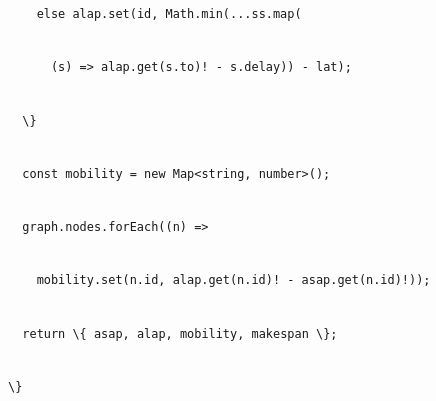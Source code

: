 \documentclass[
]{article}
\newcommand{\passthrough}[1]{#1}
\begin{document}
\passthrough{\lstinline!    !}\passthrough{\lstinline!else!}\passthrough{\lstinline! !}\passthrough{\lstinline!alap.set!}\passthrough{\lstinline!(id,!}\passthrough{\lstinline! !}\passthrough{\lstinline!Math.min!}\passthrough{\lstinline!(...!}\passthrough{\lstinline!ss.map!}\passthrough{\lstinline!(!}\strut \\
\passthrough{\lstinline!      !}\passthrough{\lstinline!(s)!}\passthrough{\lstinline! !}\passthrough{\lstinline!=>!}\passthrough{\lstinline! !}\passthrough{\lstinline!alap.get!}\passthrough{\lstinline"(s.to)!"}\passthrough{\lstinline! !}\passthrough{\lstinline!-!}\passthrough{\lstinline! !}\passthrough{\lstinline!s.delay!}\passthrough{\lstinline!))!}\passthrough{\lstinline! !}\passthrough{\lstinline!-!}\passthrough{\lstinline! !}\passthrough{\lstinline!lat!}\passthrough{\lstinline!);!}\strut \\
\passthrough{\lstinline!  !}\passthrough{\lstinline!\}!}\strut \\
\passthrough{\lstinline!  !}\passthrough{\lstinline!const!}\passthrough{\lstinline! !}\passthrough{\lstinline!mobility!}\passthrough{\lstinline! !}\passthrough{\lstinline!=!}\passthrough{\lstinline! !}\passthrough{\lstinline!new!}\passthrough{\lstinline! !}\passthrough{\lstinline!Map<string,!}\passthrough{\lstinline! !}\passthrough{\lstinline!number>();!}\strut \\
\passthrough{\lstinline!  !}\passthrough{\lstinline!graph.nodes.forEach!}\passthrough{\lstinline!((n)!}\passthrough{\lstinline! !}\passthrough{\lstinline!=>!}\strut \\
\passthrough{\lstinline!    !}\passthrough{\lstinline!mobility.set!}\passthrough{\lstinline!(n.id,!}\passthrough{\lstinline! !}\passthrough{\lstinline!alap.get!}\passthrough{\lstinline"(n.id)!"}\passthrough{\lstinline! !}\passthrough{\lstinline!-!}\passthrough{\lstinline! !}\passthrough{\lstinline!asap.get!}\passthrough{\lstinline"(n.id)!));"}\strut \\
\passthrough{\lstinline!  !}\passthrough{\lstinline!return!}\passthrough{\lstinline! !}\passthrough{\lstinline!\{!}\passthrough{\lstinline! !}\passthrough{\lstinline!asap,!}\passthrough{\lstinline! !}\passthrough{\lstinline!alap!}\passthrough{\lstinline!,!}\passthrough{\lstinline! !}\passthrough{\lstinline!mobility,!}\passthrough{\lstinline! !}\passthrough{\lstinline!makespan!}\passthrough{\lstinline! !}\passthrough{\lstinline!\};!}\strut \\
\passthrough{\lstinline!\}!}

\textbf{\hfill\break
}
\end{document}
